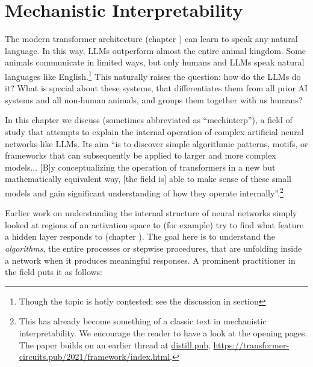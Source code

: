 \chapter{Mechanistic Interpretability}\label{ch_mechinterp}


The modern transformer architecture (chapter ) can learn to speak any natural
language. In this way, LLMs outperform
almost the entire animal kingdom. Some animals communicate in limited ways, but only humans and LLMs speak natural languages like English.\footnote{Though the topic is hotly
contested; see the discussion in section } This
naturally raises the question: how do the LLMs do it? What is special about
these systems, that differentiates them from all prior AI systems and all
non-human animals, and groups them together with us humans?

In this chapter we discuss  (sometimes
abbreviated as ``mechinterp''), a field of study that
attempts to explain the internal operation of complex artificial neural networks like LLMs. Its aim ``is
to discover simple algorithmic patterns, motifs, or frameworks that can
subsequently be applied to larger and more complex models... [B]y conceptualizing
the operation of transformers in a new but mathematically equivalent way, [the
field is] able to make sense of these small models and gain significant
understanding of how they operate
internally''\cite{elhage2021mathematical}.\footnote{This has already become
something of a classic text in mechanistic interpretability. We encourage the
reader to have a look at the opening pages. The paper builds on an earlier
thread at \url{distill.pub},
\url{https://transformer-circuits.pub/2021/framework/index.html}.} 

Earlier work on understanding the internal structure of neural networks simply looked at regions of an
activation space to (for example) try to find what feature a hidden layer responds to (chapter ). The goal
here is to understand the \emph{algorithms}, the entire processes or
stepwise procedures, that are unfolding inside a network when it produces
meaningful responses. A prominent practitioner in the field puts it as follows:

